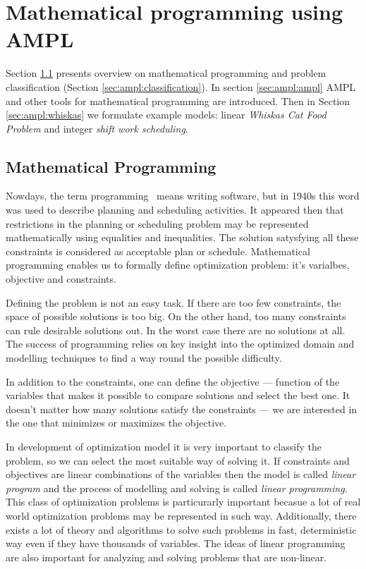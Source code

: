 \chapter{Mathematical programming using AMPL}
\label{chap:ampl} 

Section \ref{sec:ampl:mathprog} presents overview on mathematical programming and problem classification (Section \ref{sec:ampl:classification}). In section \ref{sec:ampl:ampl} AMPL and other tools for mathematical programming are introduced. Then in Section \ref{sec:ampl:whiskas} we formulate example models: linear \emph{Whiskas Cat Food Problem} and integer \emph{shift work scheduling}.

\section{Mathematical Programming}
\label{sec:ampl:mathprog}

Nowdays, the term programming~\cite{Programming} means writing software, but in 1940s this word was used to describe planning and scheduling activities. It appeared then that restrictions in the planning or scheduling problem may be represented mathematically using equalities and inequalities.  The solution satysfying all these constraints is considered as acceptable plan or schedule.  Mathematical programming enables us to formally define optimization problem: it's varialbes, objective and constraints.

Defining the problem is not an easy task. If there are too few constraints, the space of possible solutions is too big. On the other hand, too many constraints can rule desirable solutions out. In the worst case there are no solutions at all. The success of programming relies on key insight into the optimized domain and modelling techniques to find a way round the possible difficulty. 

In addition to the constraints, one can define the objective --- function of the variables that makes it possible to compare solutions and select the best one. It doesn't matter how many solutions satisfy the constraints --- we are interested in the one that minimizes or maximizes the objective.

In development of optimization model it is very important to classify the problem, so we can select the most suitable way of solving it. If constraints and objectives are linear combinations of the variables then the model is called \emph{linear program} and the process of modelling and solving is called \emph{linear programming}. This class of optimization problems is particurarly important becasue a lot of real world optimization problems may be represented in such way. Additionally, there exists a lot of theory and algorithms to solve such problems in fast, deterministic way even if they have thousands of variables. The ideas of linear programming are also important for analyzing and solving problems that are non-linear.

